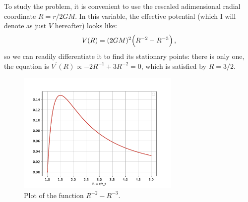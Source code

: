 \documentclass[main.tex]{subfiles}
\begin{document}
To study the problem, it is convenient to use the rescaled adimensional radial coordinate \(R = r / 2GM\). In this variable, the effective potential (which I will denote as just \(V\) hereafter) looks like: 
%
\begin{align}
  V (R) = (2GM)^2 \qty(R^{-2} - R^{-3})
\,,
\end{align}
%
so we can readily differentiate it to find its stationary points: there is only one, the equation is  \(V^{\prime }(R) \propto -2R^{-1} + 3R^{-2} =0 \), which is satisfied by \(R = 3 / 2\).

\begin{figure}[ht]
    \centering
    \includegraphics[width=0.7\textwidth]{figures/photon_effective_potential.pdf}
    \caption{Plot of the function \(R^{-2} - R^{-3}\).}
    \label{fig:effective-potential}
\end{figure}
\end{document}
